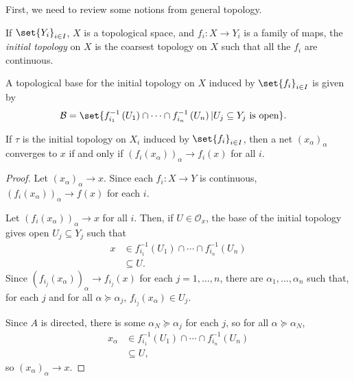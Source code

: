 \documentclass[11pt]{mypackage}
\begin{document}
First, we need to review some notions from general topology.
\begin{definition}
  If $\set{Y_i}_{i\in I}$, $X$ is a topological space, and $f_i\colon X \rightarrow Y_i$ is a family of maps, the \textit{initial topology} on $X$ is the coarsest topology on $X$ such that all the $f_i$ are continuous.\newline

  A topological base for the initial topology on $X$ induced by $\set{f_i}_{i\in I}$ is given by
  \begin{align*}
    \mathcal{B} &= \set{f_{i_1}^{-1}\left( U_1 \right)\cap\cdots\cap f_{i_n}^{-1}\left( U_n \right) | U_j\subseteq Y_j\text{ is open}}.
  \end{align*}
\end{definition}
\begin{proposition}
  If $\tau$ is the initial topology on $X_i$ induced by $\set{f_i}_{i\in I}$, then a net $\left( x_{\alpha} \right)_{\alpha}$ converges to $x$ if and only if $\left( f_i\left( x_{\alpha} \right) \right)_{\alpha}\rightarrow f_i\left( x \right)$ for all $i$.
\end{proposition}
\begin{proof}
  Let $\left( x_{\alpha} \right)_{\alpha}\rightarrow x$. Since each $f_i\colon X\rightarrow Y$ is continuous, $\left( f_i\left( x_{\alpha} \right) \right)_{\alpha}\rightarrow f(x)$ for each $i$.\newline

  Let $\left( f_i\left( x_{\alpha} \right) \right)_{\alpha}\rightarrow x$ for all $i$. Then, if $U\in \mathcal{O}_{x}$, the base of the initial topology gives open $U_j\subseteq Y_j$ such that
  \begin{align*}
    x &\in f_{i_1}^{-1}\left( U_1 \right)\cap\cdots\cap f_{i_n}^{-1}\left( U_n \right)\\
      &\subseteq U.
  \end{align*}
  Since $\left( f_{i_j}\left( x_{\alpha} \right) \right)_{\alpha}\rightarrow f_{i_j}\left( x \right)$ for each $j=1,\dots,n$, there are $\alpha_1,\dots,\alpha_n$ such that, for each $j$ and for all $\alpha\succeq \alpha_j$, $f_{i_j}\left( x_{\alpha} \right)\in U_j$.

  Since $A$ is directed, there is some $\alpha_N\succeq \alpha_j$ for each $j$, so for all $\alpha\succeq \alpha_N$,
  \begin{align*}
    x_{\alpha} &\in f_{i_1}^{-1}\left( U_1 \right)\cap\cdots\cap f_{i_n}^{-1}\left( U_n \right)\\
               &\subseteq U,
  \end{align*}
  so $\left( x_{\alpha} \right)_{\alpha}\rightarrow x$.
\end{proof}
\end{document}

